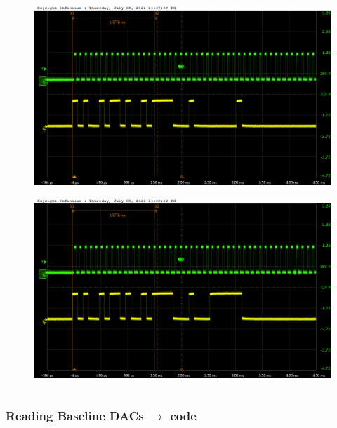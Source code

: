 \documentclass[aspectratio=169]{beamer}
\begin{document}
\begin{frame}
\begin{columns}
		\begin{center}
			\begin{figure}
				\includegraphics[width=0.55 \textwidth]{IMG/probe/09-08-2021_ch17-write01-baselinedac1.png}
				\caption{}
			\end{figure}
			\begin{figure}
				\includegraphics[width=0.55 \textwidth]{IMG/probe/09-08-2021_ch17-write63-baselinedac1.png}
				\caption{}
			\end{figure}	
		\end{center}
	\end{columns}
	\end{frame}

	\begin{frame}
	\frametitle{Reading Baseline DACs $\rightarrow$ code}

	\end{frame}
\end{document}
